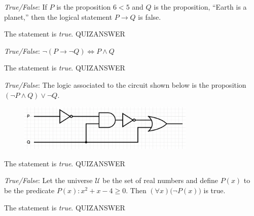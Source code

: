 \documentclass[11pt,letterpaper]{article}
\begin{document}
\thispagestyle{title}


\quizsol \textit{True/False}: If $P$ is the proposition $6 < 5$ and $Q$ is the proposition, ``Earth is a planet,'' then the logical statement $P \to Q$ is false. \pspace

\sol The statement is \textit{true}. QUIZANSWER \pvspace{0.5cm}

\quizsol \textit{True/False}: $\neg (P \to \neg Q) \Longleftrightarrow P \wedge Q$ \pspace

\sol The statement is \textit{true}. QUIZANSWER \pvspace{0.5cm}

\quizsol \textit{True/False}: The logic associated to the circuit shown below is the proposition $(\neg P \wedge Q) \vee \neg Q$. \pspace
	\begin{figure}[!ht]
	\centering
	\includegraphics[width=0.75\textwidth]{images/circuit}
	\end{figure} \par

\sol The statement is \textit{true}. QUIZANSWER \pvspace{0.5cm}




\quizsol \textit{True/False}: Let the universe $\mathcal{U}$ be the set of real numbers and define $P(x)$ to be the predicate $P(x): x^2 + x - 4 \geq 0$. Then $(\forall x) \big(\neg P(x) \big)$ is true. \pspace

\sol The statement is \textit{true}. QUIZANSWER \pvspace{0.5cm}
\end{document}
